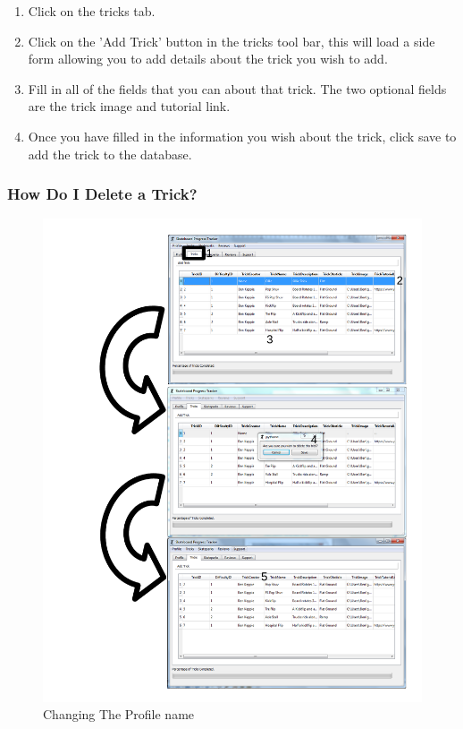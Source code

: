 \begin{enumerate}
\item Click on the tricks tab.
\item Click on the 'Add Trick' button in the tricks tool bar, this will load a side form allowing you to add details about the trick you wish to add.
\item Fill in all of the fields that you can about that trick. The two optional fields are the trick image and tutorial link.
\item Once you have filled in the information you wish about the trick, click save to add the trick to the database.
\end{enumerate}

\subsubsection{How Do I Delete a Trick?}

\begin{figure}[H]
    \includegraphics[width=\textwidth]{./Manual/Images/DeleteTrick.pdf}
    \caption{Changing The Profile name} \label{fig:Change Name}
\end{figure}

